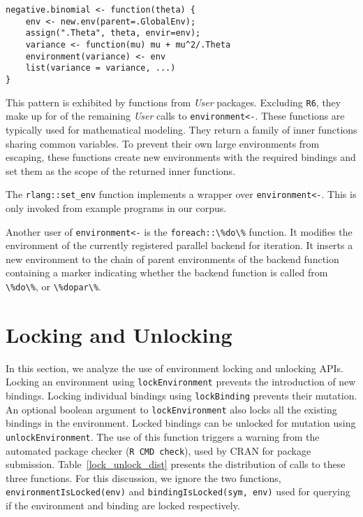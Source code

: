 \documentclass[10pt,review,sigplan,authorversion=true]{acmart}
\renewcommand{\c}[1]{\lstinline |#1|\xspace}
\begin{document}
\begin{lstlisting}
negative.binomial <- function(theta) {
    env <- new.env(parent=.GlobalEnv);
    assign(".Theta", theta, envir=env);
    variance <- function(mu) mu + mu^2/.Theta
    environment(variance) <- env
    list(variance = variance, ...)
}

\end{lstlisting}

This pattern is exhibited by \EnvAsnUserInnerFunFunCnt functions from
\EnvAsnUserInnerFunPackCnt \emph{User} packages. Excluding \c{R6}, they make up
for \EnvAsnUserInnerFunCallPerc of the remaining \emph{User} calls to
\c{environment<-}. These functions are typically used for mathematical modeling.
They return a family of inner functions sharing common variables. To prevent
their own large environments from escaping, these functions create new
environments with the required bindings and set them as the scope of the
returned inner functions.

The \c{rlang::set_env} function implements a wrapper over \c{environment<-}.
This is only invoked from example programs in our corpus.

Another user of \c{environment<-} is the \c{foreach::\%do\%} function. It
modifies the environment of the currently registered parallel backend for
iteration. It inserts a new environment to the chain of parent environments of
the backend function containing a marker indicating whether the backend function
is called from \c{\%do\%}, or \c{\%dopar\%}.

\section{Locking and Unlocking}

In this section, we analyze the use of environment locking and unlocking APIs.
Locking an environment using \c{lockEnvironment} prevents the introduction of
new bindings. Locking individual bindings using \c{lockBinding} prevents their
mutation. An optional boolean argument to \c{lockEnvironment} also locks all the
existing bindings in the environment. Locked bindings can be unlocked for
mutation using \c{unlockEnvironment}. The use of this function triggers a
warning from the automated package checker (\c{R CMD check}), used by CRAN for
package submission. Table~\ref{lock_unlock_dist} presents the distribution of
calls to these three functions. For this discussion, we ignore the two
functions, \c{environmentIsLocked(env)} and \c{bindingIsLocked(sym, env)} used
for querying if the environment and binding are locked respectively.
\end{document}
